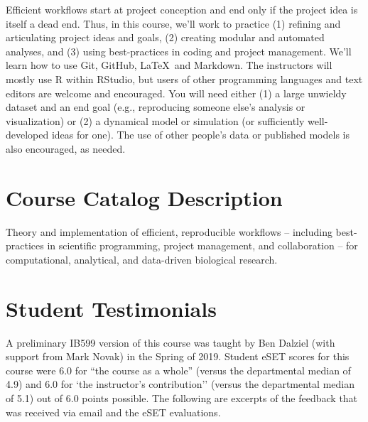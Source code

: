 \documentclass[10pt]{article}
\begin{document}
Efficient workflows start at project conception and end only if the project idea is itself a dead end.  Thus, in this course, we'll work to practice (1) refining and articulating project ideas and goals, (2) creating modular and automated analyses, and (3) using best-practices in coding and project management. We'll learn how to use Git, GitHub, \LaTeX\, and Markdown.  The instructors will mostly use \textsf{R} within RStudio, but users of other programming languages and text editors are welcome and encouraged.  You will need either (1) a large unwieldy dataset and an end goal (e.g., reproducing someone else's analysis or visualization) or (2) a dynamical model or simulation (or sufficiently well-developed ideas for one).  The use of other people's data or published models is also encouraged, as needed.

\section*{Course Catalog Description}
Theory and implementation of efficient, reproducible workflows -- including best-practices in scientific programming, project management, and collaboration --  for computational, analytical, and data-driven biological research.

\section*{Student Testimonials}
A preliminary IB599 version of this course was taught by Ben Dalziel (with support from Mark Novak) in the Spring of 2019.  Student eSET scores for this course were 6.0 for ``the course as a whole'' (versus the departmental median of 4.9) and 6.0 for `the instructor's contribution'' (versus the departmental median of 5.1) out of 6.0 points possible. The following are excerpts of the feedback that was received via email and the eSET evaluations.
\end{document}
